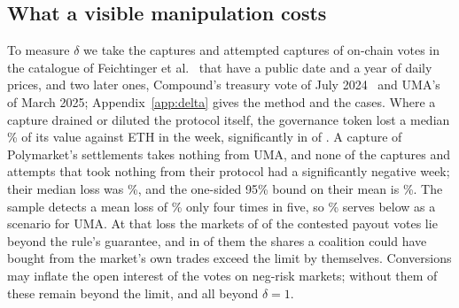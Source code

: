 \documentclass[conference,compsoc]{IEEEtran}
\begin{document}
\subsection{What a visible manipulation costs}
\label{sec:delta}
 To measure $\delta$ we take the captures and attempted captures of on-chain votes in the catalogue of Feichtinger et al.~\cite{sokdao2024} that have a public date and a year of daily prices, and two later ones, Compound's treasury vote of July 2024~\cite{invezz2024} and UMA's of March 2025; Appendix~\ref{app:delta} gives the method and the \deltaEvents{} cases. Where a capture drained or diluted the protocol itself, the governance token lost a median \deltaDrainedMedianPct\% of its value against ETH in the week, significantly in \deltaDrainedSig{} of \deltaDrainedN. A capture of Polymarket's settlements takes nothing from UMA, and none of the \deltaCleanN{} captures and attempts that took nothing from their protocol had a significantly negative week; their median loss was \deltaCleanMedianLossPct\%, and the one-sided 95\% bound on their mean is \deltaBoundAllPct\%. The sample detects a mean loss of \deltaDetectablePct\% only four times in five, so \deltaDetectablePct\% serves below as a scenario for UMA. At that loss the markets of \deltaUnprotectedAtDetectable{} of the \rampMarkets{} contested payout votes lie beyond the rule's guarantee, and in \deltaBuyableBeyond{} of them the shares a coalition could have bought from the market's own trades exceed the limit by themselves. Conversions may inflate the open interest of the \negRiskMarkets{} votes on neg-risk markets; without them \deltaUnprotectedWoNegRisk{} of these \deltaUnprotectedAtDetectable{} remain beyond the limit, and all \rampNeedOne{} beyond $\delta = 1$.
\end{document}
